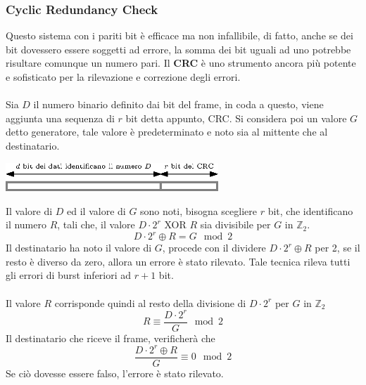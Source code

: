 \documentclass[12pt, letterpaper]{article}
\newcommand{\acc}{\\\hphantom{}\\}
\begin{document}
\subsubsection{Cyclic Redundancy Check}
Questo sistema con i pariti bit è efficace ma non infallibile, di fatto, anche se dei bit dovessero essere soggetti 
ad errore, la somma dei bit uguali ad uno potrebbe risultare comunque un numero pari.
Il \textbf{CRC} è uno strumento ancora più potente e sofisticato per la rilevazione e correzione degli errori.\acc 
Sia $D$ il numero binario definito dai bit del frame, in coda a questo, viene aggiunta una sequenza di $r$ 
bit detta appunto, CRC. Si considera poi un valore $G$ detto generatore, tale valore è predeterminato e noto sia al 
mittente che al destinatario.\begin{center}
    \includegraphics[width=0.6\textwidth ]{images/crcBit.eps}
\end{center} 
Il valore di $D$ ed il valore di $G$ sono noti, bisogna scegliere $r$ bit, che identificano il numero $R$, tali che, 
il valore $D\cdot 2^r$  XOR $R$ sia divisibile per $G$ in $\mathbb{Z}_2$.
$$ D\cdot 2^r \oplus R = G \mod{2}$$ 
Il destinatario ha noto il valore di $G$, procede con il dividere $D\cdot 2^r \oplus R$ per 2, se il resto è 
diverso da zero, allora un errore è stato rilevato. Tale tecnica rileva tutti gli errori di burst inferiori 
ad $r+1$ bit.\acc 
Il valore $R$ corrisponde quindi al resto della divisione di $D\cdot 2^r$ per $G$ in $\mathbb{Z}_2$ 
$$ R\equiv \dfrac{D\cdot 2^r}{G}\mod{2}$$
Il destinatario che riceve il frame, verificherà che $$\dfrac{D\cdot 2^r \oplus R}{G}\equiv 0 \mod{2} $$ 
Se ciò dovesse essere falso, l'errore è stato rilevato.
\end{document}
